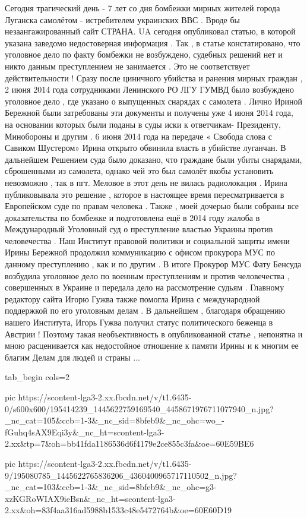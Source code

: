 Сегодня трагический день - 7 лет со дня бомбежки мирных жителей города Луганска
самолётом - истребителем  украинских ВВС . Вроде бы незаангажированный сайт
СТРАНА. UA сегодня опубликовал статью, в которой указана заведомо недостоверная
информация . Так , в статье констатировано, что уголовное дело по факту
бомбежки не возбуждено, судебных решений нет и никто данным преступлением не
занимается . Это не соответствует действительности ! Сразу  после циничного
убийства и ранения мирных граждан , 2 июня 2014 года сотрудниками Ленинского РО
ЛГУ ГУМВД  было возбуждено уголовное дело , где указано о выпущенных снарядах с
самолета . Лично Ириной Бережной были затребованы эти документы и получены уже
4 июня 2014 года, на основании которых были поданы в суды иски к ответчикам-
Президенту, Минобороны и другим . 6 июня 2014 года на передаче « Свобода слова
с Савиком Шустером» Ирина открыто обвинила власть в убийстве луганчан. В
дальнейшем Решением суда было доказано, что граждане были убиты снарядами,
сброшенными из самолета, однако чей это был самолёт якобы установить невозможно
, так в пгт. Меловое в этот день  не вилась радиолокация . Ирина публиковывала
это решение , которое  в настоящее время пересматривается в Европейском суде по
правам человека . Также , моей дочерью были собраны все доказательства по
бомбежке и подготовлена ещё в 2014 году жалоба в Международный Уголовный суд  о
преступление властью Украины против человечества . Наш Институт правовой
политики и социальной защиты имени Ирины Бережной продолжил коммуникацию с
офисом прокурора МУС по данному преступлению , как и по другим . В итоге
Прокурор МУС Фату Бенсуда возбудила уголовное дело по военным преступлениям и
против человечества , совершенных в Украине и передала дело  на рассмотрение
судьям . Главному редактору сайта Игорю Гужва также помогла Ирина с
международной поддержкой по его уголовным делам . В дальнейшем , благодаря
обращению нашего Института, Игорь Гужва получил статус политического беженца в
Австрии ! Поэтому такая необъективность в опубликованной статье , непонятна и
мною расценивается как недостойное отношение к памяти Ирины и к многим ее
благим Делам  для людей и страны ...

\ifcmt
  tab_begin cols=2

     pic https://scontent-lga3-2.xx.fbcdn.net/v/t1.6435-0/s600x600/195414239_1445622759169540_4458671976711077940_n.jpg?_nc_cat=105&ccb=1-3&_nc_sid=8bfeb9&_nc_ohc=wo_-fGuhq4sAX9Eqi3y&_nc_ht=scontent-lga3-2.xx&tp=7&oh=bb41fda1186536d6f4179e2ce855c3fa&oe=60E59BE6

     pic https://scontent-lga3-2.xx.fbcdn.net/v/t1.6435-9/195080785_1445622765836206_4360400965717110502_n.jpg?_nc_cat=103&ccb=1-3&_nc_sid=8bfeb9&_nc_ohc=g3-xzKGRoWIAX9ieBsn&_nc_ht=scontent-lga3-2.xx&oh=83f4aa316ad5988b1533c48e5472764b&oe=60E60D19

